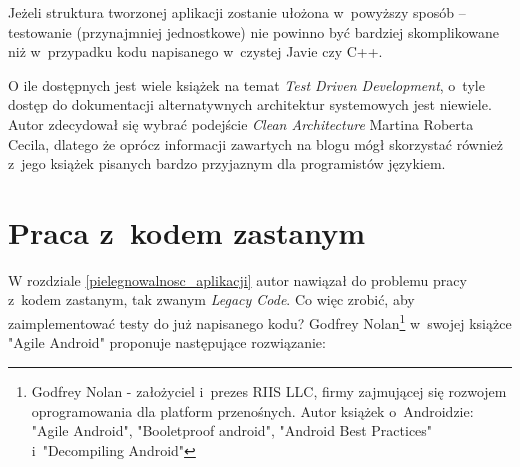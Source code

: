 Jeżeli struktura tworzonej aplikacji zostanie ułożona w~powyższy sposób – testowanie (przynajmniej jednostkowe) nie powinno być bardziej skomplikowane niż w~przypadku kodu napisanego w~czystej Javie czy C++.

O ile dostępnych jest wiele książek na temat \textit{Test Driven Development}, o~tyle dostęp do dokumentacji alternatywnych architektur systemowych jest niewiele. Autor zdecydował się wybrać podejście \textit{Clean Architecture} Martina Roberta Cecila, dlatego że oprócz informacji zawartych na blogu mógł skorzystać również z~jego książek pisanych bardzo przyjaznym dla programistów językiem.

\section{Praca z~kodem zastanym}
\label{legacy_code}
W rozdziale \ref{pielegnowalnosc_aplikacji} autor nawiązał do problemu pracy z~kodem zastanym, tak zwanym \textit{Legacy Code}.
Co więc zrobić, aby zaimplementować testy do już napisanego kodu? Godfrey Nolan\footnote{Godfrey Nolan - założyciel i~prezes RIIS LLC, firmy zajmującej się rozwojem oprogramowania dla platform przenośnych. Autor książek o~Androidzie: "Agile Android", "Booletproof android", "Android Best Practices" i~"Decompiling Android"} w~swojej książce "Agile Android"\cite{bib:agile:android} proponuje następujące rozwiązanie:

